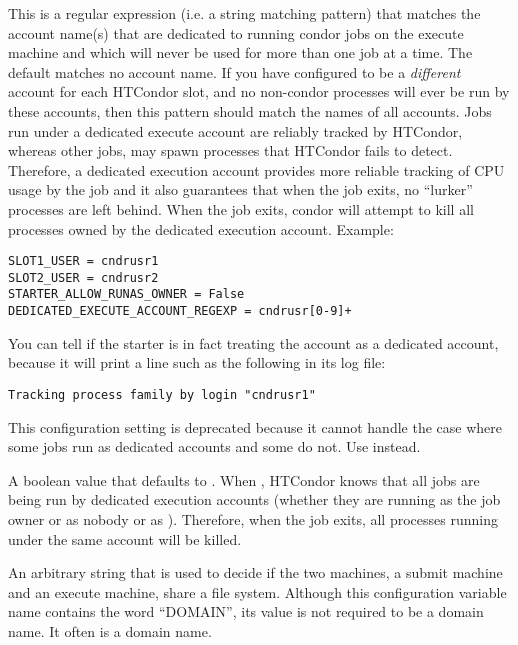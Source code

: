 \begin{description}
\label{param:DedicatedExecuteAccountRegexp}
\item[\Macro{DEDICATED\_EXECUTE\_ACCOUNT\_REGEXP}]
  This is a regular expression (i.e. a string matching pattern) that
  matches the account name(s) that are dedicated to running condor
  jobs on the execute machine and which will never be used for more
  than one job at a time.  The default matches no account name.  If
  you have configured  to be a \emph{different}
  account for each HTCondor slot, and no non-condor processes will ever be
  run by these accounts, then this pattern should match the names of
  all  accounts.  Jobs run under a dedicated
  execute account are reliably tracked by HTCondor, whereas other jobs,
  may spawn processes that HTCondor fails to detect.  Therefore, a
  dedicated execution account provides more reliable tracking of CPU
  usage by the job and it also guarantees that when the job exits, no
  ``lurker'' processes are left behind.  When the job exits, condor
  will attempt to kill all processes owned by the dedicated execution
  account.  Example:

\begin{verbatim}
SLOT1_USER = cndrusr1
SLOT2_USER = cndrusr2
STARTER_ALLOW_RUNAS_OWNER = False
DEDICATED_EXECUTE_ACCOUNT_REGEXP = cndrusr[0-9]+
\end{verbatim}

  You can tell if the starter is in fact treating the account as a
  dedicated account, because it will print a line such as the following
  in its log file:

\begin{verbatim}
Tracking process family by login "cndrusr1"
\end{verbatim}


\label{param:ExecuteLoginIsDedicated}
\item[\Macro{EXECUTE\_LOGIN\_IS\_DEDICATED}]
  This configuration setting is deprecated because it cannot handle the
  case where some jobs run as dedicated accounts and some do not.  Use
   instead.

  A boolean value that defaults to .  When ,
  HTCondor knows that all jobs are being run by dedicated execution
  accounts (whether they are running as the job owner or as nobody or as
  ).  Therefore, when the job exits, all processes
  running under the same account will be killed.

\label{param:FilesystemDomain}
\item[\Macro{FILESYSTEM\_DOMAIN}]
  An arbitrary string that is used to decide if
  the two machines, a submit machine and an execute machine,
  share a file system.
  Although this configuration variable name contains the word ``DOMAIN'',
  its value is not required to be a domain name. 
  It often is a domain name.


\end{description}
